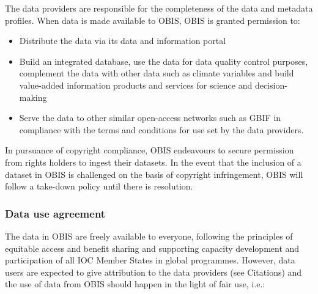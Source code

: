 \documentclass[
  letterpaper,
  DIV=11,
  numbers=noendperiod,
  oneside]{scrreprt}
\providecommand{\tightlist}{%
  \setlength{\itemsep}{0pt}\setlength{\parskip}{0pt}}\usepackage{longtable,booktabs,array}
\begin{document}
The data providers are responsible for the completeness of the data and
metadata profiles. When data is made available to OBIS, OBIS is granted
permission to:

\begin{itemize}
\tightlist
\item
  Distribute the data via its data and information portal
\item
  Build an integrated database, use the data for data quality control
  purposes, complement the data with other data such as climate
  variables and build value-added information products and services for
  science and decision-making
\item
  Serve the data to other similar open-access networks such as GBIF in
  compliance with the terms and conditions for use set by the data
  providers.
\end{itemize}

In pursuance of copyright compliance, OBIS endeavours to secure
permission from rights holders to ingest their datasets. In the event
that the inclusion of a dataset in OBIS is challenged on the basis of
copyright infringement, OBIS will follow a take-down policy until there
is resolution.

\hypertarget{data-use-agreement}{%
\subsubsection{Data use agreement}\label{data-use-agreement}}

The data in OBIS are freely available to everyone, following the
principles of equitable access and benefit sharing and supporting
capacity development and participation of all IOC Member States in
global programmes. However, data users are expected to give attribution
to the data providers (see Citations) and the use of data from OBIS
should happen in the light of fair use, i.e.:
\end{document}
